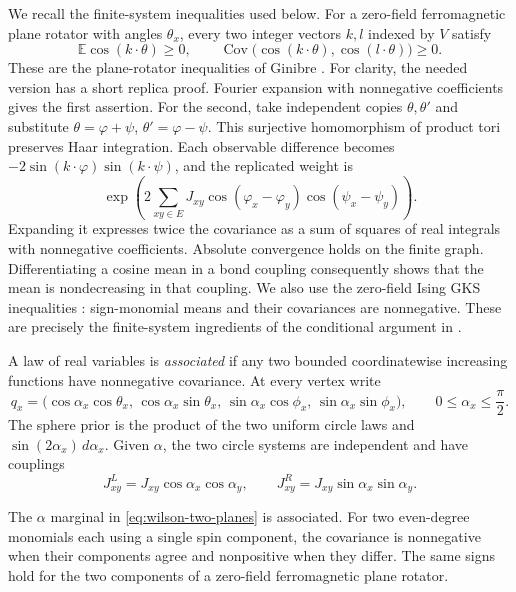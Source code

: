 We recall the finite-system inequalities used below. For a zero-field
ferromagnetic plane rotator with angles $\theta_x$, every two integer
vectors $k,l$ indexed by $V$ satisfy
\begin{equation}
 \mathbb E\cos(k\cdot\theta)\ge0,\qquad
 \operatorname{Cov}\bigl(\cos(k\cdot\theta),
                         \cos(l\cdot\theta)\bigr)\ge0.
 \label{eq:wilson-xy-ginibre}
\end{equation}
These are the plane-rotator inequalities of Ginibre
\cite{Ginibre1970}. For clarity, the needed version has a short
replica proof. Fourier expansion with nonnegative coefficients gives
the first assertion. For the second, take independent copies
$\theta,\theta'$ and substitute
$\theta=\varphi+\psi$, $\theta'=\varphi-\psi$. This surjective
homomorphism of product tori preserves Haar integration. Each
observable difference becomes
$-2\sin(k\cdot\varphi)\sin(k\cdot\psi)$, and the replicated weight is
\[
 \exp\left(2\sum_{xy\in E}J_{xy}
       \cos(\varphi_x-\varphi_y)\cos(\psi_x-\psi_y)\right).
\]
Expanding it expresses twice the covariance as a sum of squares of
real integrals with nonnegative coefficients. Absolute convergence
holds on the finite graph. Differentiating a cosine mean in a bond
coupling consequently shows that the mean is nondecreasing in that
coupling. We also use the zero-field Ising GKS inequalities
\cite{KellySherman1968}:
sign-monomial means and their covariances are nonnegative.
These are precisely the finite-system ingredients of the conditional
argument in \cite[Section~3.11]{SharpO4}.

A law of real variables is \emph{associated} if any two bounded
coordinatewise increasing functions have nonnegative covariance.
At every vertex write
\begin{equation}
 q_x=\bigl(\cos\alpha_x\cos\theta_x,\,
           \cos\alpha_x\sin\theta_x,\,
           \sin\alpha_x\cos\phi_x,\,
           \sin\alpha_x\sin\phi_x\bigr),
 \qquad 0\le\alpha_x\le\frac{\pi}{2}.
 \label{eq:wilson-two-planes}
\end{equation}
The sphere prior is the product of the two uniform circle laws and
$\sin(2\alpha_x)\,d\alpha_x$. Given $\alpha$, the two circle systems
are independent and have couplings
\[
 J^L_{xy}=J_{xy}\cos\alpha_x\cos\alpha_y,\qquad
 J^R_{xy}=J_{xy}\sin\alpha_x\sin\alpha_y.
\]

\begin{lemma}
\label{lem:wilson-signs}
The $\alpha$ marginal in \eqref{eq:wilson-two-planes} is associated.
For two even-degree monomials each using a single spin component,
the covariance is nonnegative when their components agree and
nonpositive when they differ. The same signs hold for the two
components of a zero-field ferromagnetic plane rotator.
\end{lemma}

